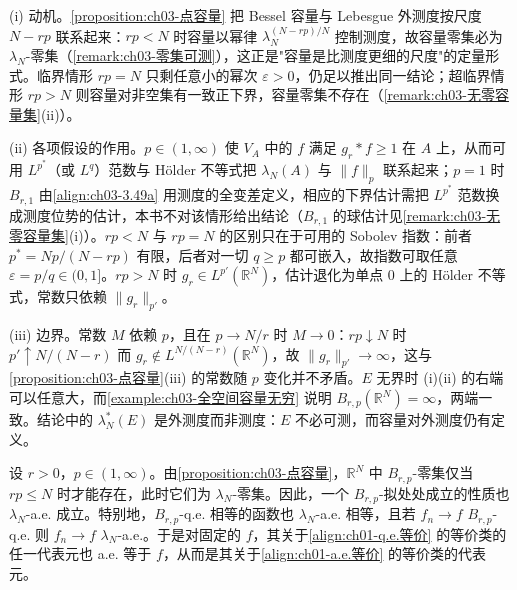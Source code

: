 \documentclass[../../main.tex]{subfiles}%
\begin{document}
\begin{remark}\label{remark:ch03-点容量动机}
(i) 动机。\cref{proposition:ch03-点容量} 把 Bessel 容量与 Lebesgue 外测度按尺度 $N-rp$ 联系起来：$rp<N$ 时容量以幂律 $\lambda_N^{(N-rp)/N}$ 控制测度，故容量零集必为 $\lambda_N$-零集（\cref{remark:ch03-零集可测}），这正是"容量是比测度更细的尺度"的定量形式。临界情形 $rp=N$ 只剩任意小的幂次 $\varepsilon>0$，仍足以推出同一结论；超临界情形 $rp>N$ 则容量对非空集有一致正下界，容量零集不存在（\cref{remark:ch03-无零容量集}(ii)）。

(ii) 各项假设的作用。$p\in(1,\infty)$ 使 $V_A$ 中的 $f$ 满足 $g_r*f\geqslant1$ 在 $A$ 上，从而可用 $L^{p^*}$（或 $L^q$）范数与 Hölder 不等式把 $\lambda_N(A)$ 与 $\|f\|_p$ 联系起来；$p=1$ 时 $B_{r,1}$ 由\eqref{align:ch03-3.49a} 用测度的全变差定义，相应的下界估计需把 $L^{p^*}$ 范数换成测度位势的估计，本书不对该情形给出结论（$B_{r,1}$ 的球估计见\cref{remark:ch03-无零容量集}(i)）。$rp<N$ 与 $rp=N$ 的区别只在于可用的 Sobolev 指数：前者 $p^*=Np/(N-rp)$ 有限，后者对一切 $q\geqslant p$ 都可嵌入，故指数可取任意 $\varepsilon=p/q\in(0,1]$。$rp>N$ 时 $g_r\in L^{p'}(\mathbb{R}^N)$，估计退化为单点 $0$ 上的 Hölder 不等式，常数只依赖 $\|g_r\|_{p'}$。

(iii) 边界。常数 $M$ 依赖 $p$，且在 $p\to N/r$ 时 $M\to0$：$rp\downarrow N$ 时 $p'\uparrow N/(N-r)$ 而 $g_r\notin L^{N/(N-r)}(\mathbb{R}^N)$，故 $\|g_r\|_{p'}\to\infty$，这与\cref{proposition:ch03-点容量}(iii) 的常数随 $p$ 变化并不矛盾。$E$ 无界时 (i)(ii) 的右端可以任意大，而\cref{example:ch03-全空间容量无穷} 说明 $B_{r,p}(\mathbb{R}^N)=\infty$，两端一致。结论中的 $\lambda_N^*(E)$ 是外测度而非测度：$E$ 不必可测，而容量对外测度仍有定义。
\end{remark}

\begin{remark}\label{remark:ch03-零集可测}
设 $r>0$，$p\in(1,\infty)$。由\cref{proposition:ch03-点容量}，$\mathbb{R}^N$ 中 $B_{r,p}$-零集仅当 $rp\leqslant N$ 时才能存在，此时它们为 $\lambda_N$-零集。因此，一个 $B_{r,p}$-拟处处成立的性质也 $\lambda_N$-a.e. 成立。特别地，$B_{r,p}$-q.e. 相等的函数也 $\lambda_N$-a.e. 相等，且若 $f_n\to f$ $B_{r,p}$-q.e. 则 $f_n\to f$ $\lambda_N$-a.e.。于是对固定的 $f$，其关于\eqref{align:ch01-q.e.等价} 的等价类的任一代表元也 a.e. 等于 $f$，从而是其关于\eqref{align:ch01-a.e.等价} 的等价类的代表元。
\end{remark}
\end{document}

